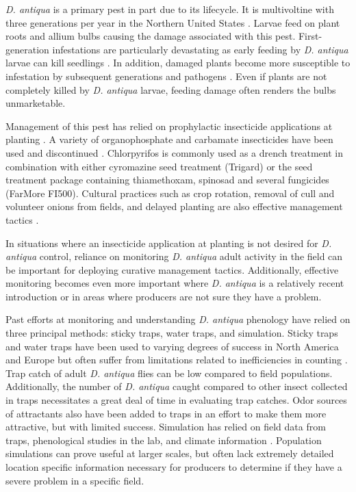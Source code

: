 \documentclass[alpha-refs]{wiley-article}
\begin{document}
\textit{D. antiqua} is a primary pest in part due to its lifecycle.  It is multivoltine with three generations per year in the Northern United States \citep{eckenrode1975population, hoepting2004insecticide}.  Larvae feed on plant roots and allium bulbs causing the damage associated with this pest.  First-generation infestations are particularly devastating as early feeding by \textit{D. antiqua} larvae can kill seedlings \citep{nault2006onion, nault2006performance}.  In addition, damaged plants become more susceptible to infestation by subsequent generations and pathogens \citep{eckenrode1986impact,nault2006performance}.  Even if plants are not completely killed by \textit{D. antiqua} larvae, feeding damage often renders the bulbs unmarketable.  

Management of this pest has relied on prophylactic insecticide applications at planting \citep{nault2006performance}.  A variety of organophosphate and carbamate insecticides have been used and discontinued \citep{nault2006performance}.  Chlorpyrifos is commonly used as a drench treatment in combination with either cyromazine seed treatment (Trigard)  \citep{nault2006performance} or the seed treatment package containing thiamethoxam, spinosad and several fungicides (FarMore FI500).  Cultural practices such as crop rotation, removal of cull and volunteer onions from fields, and delayed planting are also effective management tactics  \citep{martinson1988dispersal, finch1985influence, nault2011delaying}.  

In situations where an insecticide application at planting is not desired for \textit{D. antiqua} control, reliance on monitoring \textit{D. antiqua} adult activity in the field can be important for deploying curative management tactics. Additionally, effective monitoring becomes even more important where \textit{D. antiqua} is a relatively recent introduction or in areas where producers are not sure they have a problem. 

Past efforts at monitoring and understanding \textit{D. antiqua} phenology have relied on three principal methods: sticky traps, water traps, and simulation.  Sticky traps and water traps have been used to varying degrees of success in North America and Europe but often suffer from limitations related to inefficiencies in counting \citep{thomingdeveloping,otto2000development}.  Trap catch of adult \textit{D. antiqua} flies can be low compared to field populations.  Additionally, the number of \textit{D. antiqua} caught compared to other insect collected in traps necessitates a great deal of time in evaluating trap catches.  Odor sources of attractants also have been added to traps in an effort to make them more attractive, but with limited success.  Simulation has relied on field data from traps, phenological studies in the lab, and climate information \citep{thomingdeveloping,otto2000development,ning2017predicting}.  Population simulations can prove useful at larger scales, but often lack extremely detailed location specific information necessary for producers to determine if they have a severe problem in a specific field.  
\end{document}

